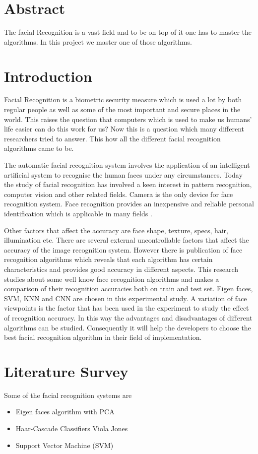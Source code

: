 \documentclass[a4paper]{article}
\begin{document}
\section{Abstract}
The facial Recognition is a vast field and to be on top of it one has to master the algorithms. In this project we master one of those algorithms.
\clearpage
\section{Introduction}
Facial Recognition is a biometric security measure which is used a lot by both regular people as well as some of the most important and secure places in the world. This raises the question that computers which is used to make us humans' life easier can do this work for us? Now this is a question which many different researchers tried to answer. This how all the different facial recognition algorithms came to be.

The automatic facial recognition system involves the application of an intelligent artificial system to  
recognise the human faces under any circumstances. Today the study of facial recognition has  
involved a keen interest in pattern recognition, computer vision and other related fields. Camera is the only device for face recognition system. Face recognition provides an inexpensive and reliable  
personal identification which is applicable in many fields
\cite{phankokkruad2017influence}.

Other factors that affect the accuracy are face shape, texture, specs, hair,
illumination etc. There are several external uncontrollable factors that affect the accuracy of the image
recognition system. However there is publication of face recognition algorithms which reveals that
each algorithm has certain characteristics and provides good accuracy in different aspects.
This research studies about some well know face recognition algorithms and makes a comparison of
their recognition accuracies both on train and test set. Eigen faces, SVM, KNN and CNN are chosen
in this experimental study. A variation of face viewpoints is the factor that has been used in the
experiment to study the effect of recognition accuracy. In this way the advantages and disadvantages
of different algorithms can be studied. Consequently it will help the developers to choose the best
facial recognition algorithm in their field of implementation\cite{paul2020comparative}.
\clearpage
\section{Literature Survey}
Some of the facial recognition systems are
\begin{itemize}
    \item {Eigen faces algorithm with PCA}
    \item {Haar-Cascade Classifiers Viola Jones}
    \item {Support Vector Machine (SVM)}
\end{itemize}
\end{document}
